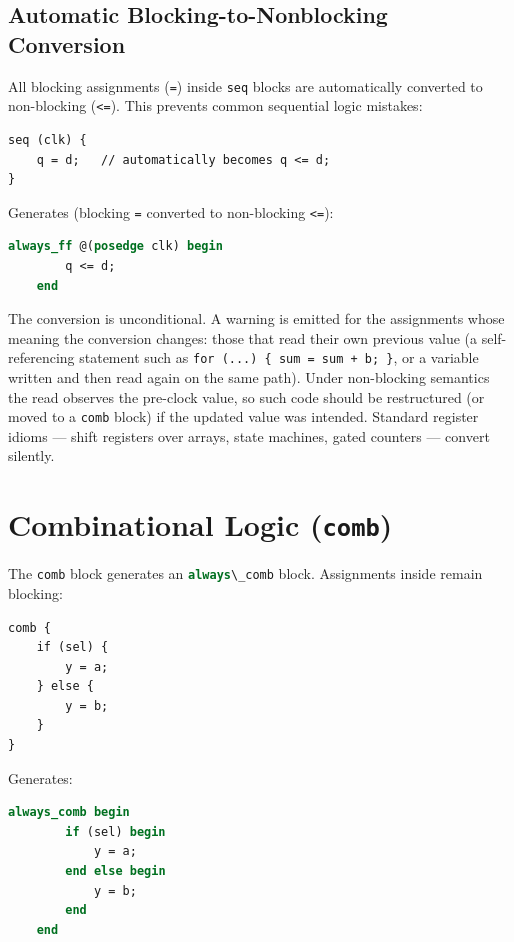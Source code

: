 \documentclass[lang=en,11pt]{elegantbook}
\newcommand{\code}[1]{\texttt{#1}}
\newcommand{\svinline}[1]{\lstinline[language=SystemVerilog]|#1|}
\begin{document}
\section{Automatic Blocking-to-Nonblocking Conversion}

All blocking assignments (\code{=}) inside \code{seq} blocks are automatically converted to non-blocking (\code{<=}). This prevents common sequential logic mistakes:

\begin{lstlisting}[language=Slip]
seq (clk) {
    q = d;   // automatically becomes q <= d;
}
\end{lstlisting}

Generates (blocking \code{=} converted to non-blocking \code{<=}):

\begin{lstlisting}[language=SystemVerilog]
    always_ff @(posedge clk) begin
        q <= d;
    end
\end{lstlisting}

The conversion is unconditional. A warning is emitted for the
assignments whose meaning the conversion changes: those that read their
own previous value (a self-referencing statement such as
\code{for (...) \{ sum = sum + b; \}}, or a variable written and then read
again on the same path). Under non-blocking semantics the read observes
the pre-clock value, so such code should be restructured (or moved to a
\code{comb} block) if the updated value was intended. Standard register
idioms --- shift registers over arrays, state machines, gated counters
--- convert silently.

\chapter{Combinational Logic (\code{comb})}

The \code{comb} block generates an \svinline{always\_comb} block. Assignments inside remain blocking:

\begin{lstlisting}[language=Slip]
comb {
    if (sel) {
        y = a;
    } else {
        y = b;
    }
}
\end{lstlisting}

Generates:

\begin{lstlisting}[language=SystemVerilog]
    always_comb begin
        if (sel) begin
            y = a;
        end else begin
            y = b;
        end
    end
\end{lstlisting}
\end{document}
